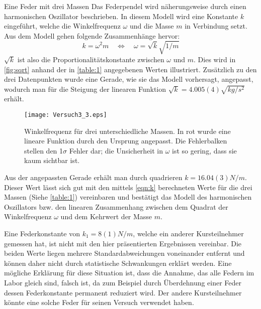 \documentclass{alex_gp}
\begin{document}
\begin{mybox}{Eine Feder mit drei Massen}
	Das Federpendel wird näherungsweise durch einen harmonischen Oszillator beschrieben. In diesem Modell wird eine Konstante \( k \) eingeführt, welche die Winkelfrequenz \( \omega \) und die Masse \( m \) in Verbindung setzt. Aus dem Modell gehen folgende Zusammenhänge hervor:
	\begin{equation}\label{eqn:k}
		k = \omega^2 m \quad \Longleftrightarrow\quad \omega = \sqrt{k}\sqrt{1/m}
	\end{equation}
	\( \sqrt{k} \) ist also die Proportionalitätskonstante zwischen \( \omega \) und \( m \). Dies wird in \autoref{fig:sqrt} anhand der in \autoref{table:1} angegebenen Werten illustriert. Zusätzlich zu den drei Datenpunkten wurde eine Gerade, wie sie das Modell vorhersagt, angepasst, wodurch man für die Steigung der linearen Funktion \( \sqrt{k} = 4.005(4) \unit{\sqrt{kg / s^2}} \) erhält.
	\begin{figure}[H]
		\centering
		\texttt{[image: Versuch3\_3.eps]}
		\caption{Winkelfrequenz für drei unterschiedliche Massen. In rot wurde eine lineare Funktion durch den Ursprung angepasst. Die Fehlerbalken stellen den 1$\sigma$ Fehler dar; die Unsicherheit in \( \omega \) ist so gering, dass sie kaum sichtbar ist.}
		\label{fig:sqrt}
	\end{figure}
	Aus der angepassten Gerade erhält man durch quadrieren \( k = 16.04(3) \unit{N/m} \). Dieser Wert lässt sich gut mit den mittels \autoref{eqn:k} berechneten Werte für die drei Massen (Siehe \autoref{table:1}) vereinbaren und bestätigt das Modell des harmonischen Oszillators bzw. den linearen Zusammenhang zwischen dem Quadrat der Winkelfrequenz $\omega$ und dem Kehrwert der Masse \( m \). 

	Eine Federkonstante von \( k_1 = 8(1) \unit{N/m} \), welche ein anderer Kursteilnehmer gemessen hat, ist nicht mit den hier präsentierten Ergebnissen vereinbar. Die beiden Werte liegen mehrere Standardabweichungen voneinander entfernt und können daher nicht durch statistische Schwankungen erklärt werden. Eine mögliche Erklärung für diese Situation ist, dass die Annahme, das alle Federn im Labor gleich sind, falsch ist, da zum Beispiel durch Überdehnung einer Feder dessen Federkonstante permanent reduziert wird. Der andere Kursteilnehmer könnte eine solche Feder für seinen Versuch verwendet haben.
\end{mybox}
\end{document}
